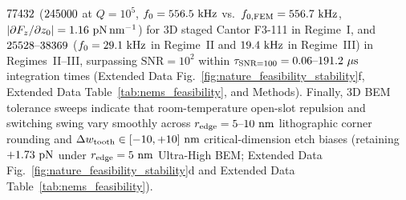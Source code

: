\documentclass[pdflatex,sn-nature]{sn-jnl}
\DeclareRobustCommand{\roundzero}[1]{\fpeval{round(#1,0)}}
\DeclareRobustCommand{\roundone}[1]{\fpeval{round(#1,1)}}
\DeclareRobustCommand{\roundtwo}[1]{\fpeval{round(#1,2)}}
\begin{document}
$\roundzero{\NatureFthreeOneoneoneSnrOneSecQoneefour}$ ($\roundzero{\NatureFthreeOneoneoneSnrOneSecQoneefive}$ at $Q=10^5$, $f_0 = \roundone{\NatureFthreeOneoneoneFZeroRegoneKhz}\text{ kHz}$ vs.\ $f_{0,\rm FEM} = \roundone{\NatureFthreeOneoneoneFemFreqRegoneKhz}\text{ kHz}$, $|\partial F_z/\partial z_0| = \roundtwo{\fpeval{abs(\NatureFthreeOneoneoneDfzDzzeroPnPerNm)}}\text{ pN}\,\text{nm}^{-1}$) for 3D staged Cantor F3-111 in Regime~I, and $\roundzero{\NatureRotCeightCompactNtwoSnrOneSecRegtwo}\text{--}\roundzero{\NatureCantorNtwoHybridrzSnrOneSecRegthree}$ ($f_0 = \roundone{\NatureCantorNtwoHybridrzResFreqRegimeTwoKhz}\text{ kHz}$ in Regime~II and $\roundone{\NatureCantorNtwoHybridrzResFreqRegimeThreeKhz}\text{ kHz}$ in Regime~III) in Regimes~II--III, surpassing $\mathrm{SNR} = 10^2$ within $\tau_{\rm SNR=100} = \roundtwo{\NatureFthreeOneoneoneTauSnronezerozeroRegthreeQoneefourUs}\text{--}\roundone{\NatureRotCeightCompactNtwoTauSnronezerozeroRegoneQoneefourUs}\ \mu\text{s}$ integration times (Extended Data Fig.~\ref{fig:nature_feasibility_stability}f, Extended Data Table~\ref{tab:nems_feasibility}, and Methods). Finally, 3D BEM tolerance sweeps indicate that room-temperature open-slot repulsion and switching swing vary smoothly across $r_{\rm edge} = 5\text{--}10\text{ nm}$ lithographic corner rounding and $\Delta w_{\rm tooth} \in [-10, +10]\text{ nm}$ critical-dimension etch biases (retaining $+\roundtwo{\NatureCantorNtwoHybridrzDiscretizationPullInBoundsRfiveUltraFRepPn}\text{ pN}$ under $r_{\rm edge}=5\text{ nm}$ Ultra-High BEM; Extended Data Fig.~\ref{fig:nature_feasibility_stability}d and Extended Data Table~\ref{tab:nems_feasibility}).
\end{document}
